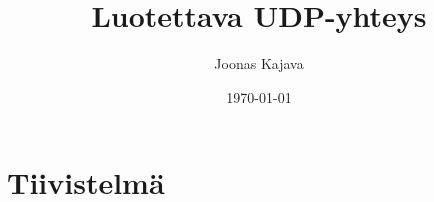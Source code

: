 \documentclass[a4paper]{article}
\title{Luotettava UDP-yhteys}
\author{Joonas Kajava}
\date{\today}
\begin{document}
    \maketitle
    \newpage


    \section*{Tiivistelmä}

    
    

    \layout
\end{document}
